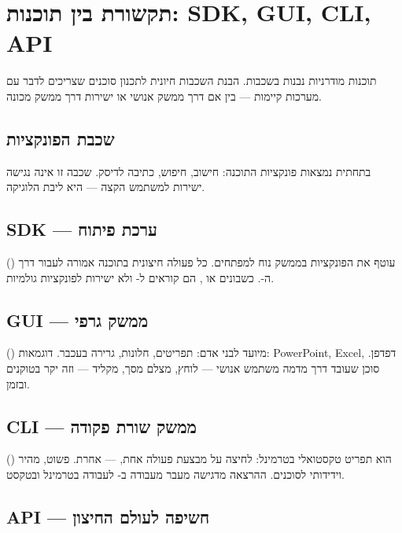 \section{תקשורת בין תוכנות: SDK, GUI, CLI, API}

תוכנות מודרניות נבנות בשכבות. הבנת השכבות חיונית לתכנון סוכנים שצריכים
לדבר עם מערכות קיימות --- בין אם דרך ממשק אנושי או ישירות דרך ממשק מכונה.



\subsection{שכבת הפונקציות}

בתחתית נמצאות פונקציות התוכנה: חישוב, חיפוש, כתיבה לדיסק. שכבה זו אינה
נגישה ישירות למשתמש הקצה --- היא ליבת הלוגיקה.

\subsection{SDK --- ערכת פיתוח}

 () עוטף את הפונקציות בממשק נוח
למפתחים. כל פעולה חיצונית בתוכנה אמורה לעבור דרך ה-. כשבונים
 או , הם קוראים ל- ולא ישירות לפונקציות גולמיות.

\subsection{GUI --- ממשק גרפי}

 () מיועד לבני אדם: תפריטים, חלונות,
גרירה בעכבר. דוגמאות: PowerPoint, Excel, דפדפן. סוכן שעובד דרך 
מדמה משתמש אנושי --- לוחץ, מצלם מסך, מקליד --- וזה יקר בטוקנים ובזמן.

\subsection{CLI --- ממשק שורת פקודה}

 () הוא תפריט טקסטואלי בטרמינל:
לחיצה על  מבצעת פעולה אחת,  --- אחרת. פשוט, מהיר וידידותי
לסוכנים. ההרצאה מדגישה מעבר מעבודה ב- לעבודה בטרמינל ובטקסט.

\subsection{API --- חשיפה לעולם החיצון}

